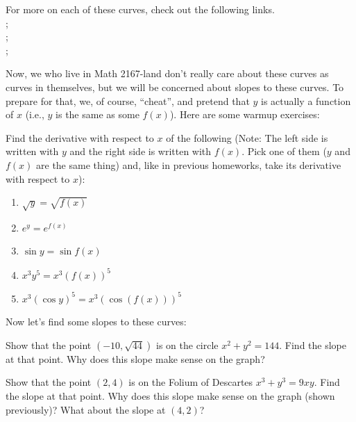 \documentclass{ximera}
\begin{document}
For more on each of these curves, check out the following links.\\ 
;\\ ; \\
;\\ 

Now, we who live in Math 2167-land don't really care about these curves as curves in themselves, but we will be concerned about slopes to these curves.  To prepare for that, we, of course, ``cheat'', and pretend that $y$ is actually a function of $x$ (i.e., $y$ is the same as some $f(x)$).  Here are some warmup exercises:

\begin{exercise} 
Find the derivative with respect to $x$ of the following (Note: The left side is written with $y$ and the right side is written with $f(x)$.  Pick one of them ($y$ and $f(x)$ are the same thing) and, like in previous homeworks, take its derivative with respect to $x$):
\begin{enumerate}
    \item $\sqrt{y} = \sqrt{f(x)}$
    \item $e^y = e^{f(x)}$
    \item $\sin y = \sin f(x)$
    \item $x^3y^5 = x^3(f(x))^5$
    \item $x^3 (\cos y)^5 = x^3(\cos (f(x)))^5$
\end{enumerate}
\end{exercise}
        Now let's find some slopes to these curves:
\begin{exercise} 
Show that the point $(-10,  \sqrt{44})$ is on the circle  $x^2 + y^2 = 144$.  Find the slope at that point.  Why does this slope make sense on the graph?
\end{exercise}
\begin{exercise} 
Show that the point $(2, 4)$ is on the Folium of Descartes  $x^3+y^3=9xy$.  Find the slope at that point.  Why does this slope make sense on the graph (shown previously)?  What about the slope at $(4,2)$?
\end{exercise}
\end{document}
